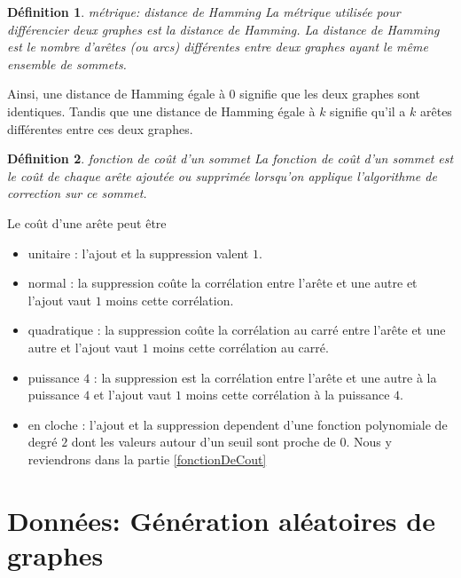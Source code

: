 \documentclass[onecolumn, 12pt]{book}
\newtheorem{definition}{D\'efinition}
\begin{document}
\begin{definition}{ m\'etrique: distance de Hamming} \newline
La m\'etrique utilis\'ee pour diff\'erencier deux graphes est la {\em distance de Hamming}.
La distance de Hamming est le nombre d'ar\^etes (ou arcs) diff\'erentes entre deux graphes ayant le m\^eme ensemble de sommets. 
\end{definition}
Ainsi, une distance de Hamming \'egale \`a $0$ signifie que les deux graphes sont identiques. Tandis que  une distance de Hamming \'egale \`a $k$ signifie qu'il a $k$ ar\^etes diff\'erentes entre ces deux graphes.

\begin{definition}{ fonction de co\^ut d'un sommet} \newline
La fonction de co\^ut d'un sommet est le co\^ut de chaque ar\^ete ajout\'ee ou supprim\'ee lorsqu'on applique l'algorithme de correction sur ce sommet.
\end{definition}
Le co\^ut d'une ar\^ete peut \^etre
\begin{itemize}
	\item unitaire : l'ajout et la suppression valent $1$.
	\item normal : la suppression co\^ute la corr\'elation entre l'ar\^ete et une autre et l'ajout vaut  $1$ moins cette corr\'elation.
	\item quadratique : la suppression co\^ute la corr\'elation au carr\'e entre l'ar\^ete et une autre  et l'ajout vaut  $1$ moins cette corr\'elation au carr\'e.
	\item puissance $4$ :  la suppression est la corr\'elation entre l'ar\^ete et une autre \`a la puissance $4$ et l'ajout vaut  $1$ moins cette corr\'elation \`a la puissance $4$.
	\item en cloche : l'ajout et la suppression dependent d'une fonction polynomiale de degr\'e $2$ dont les valeurs autour d'un seuil sont proche de $0$. Nous y reviendrons dans la partie \ref{fonctionDeCout} 
\end{itemize}

\section{Donn\'ees: G\'en\'eration al\'eatoires de graphes} 
\end{document}
